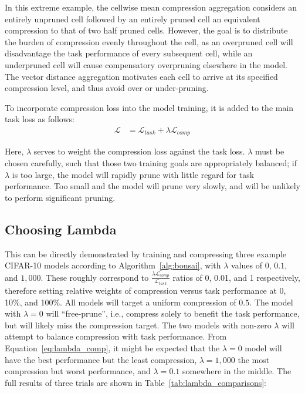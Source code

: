 In this extreme example, the cellwise mean compression aggregation considers an entirely unpruned cell followed by
an entirely pruned cell an equivalent compression to that of two half pruned cells. However, the goal is to distribute the burden
of compression evenly throughout the cell, as an overpruned cell will disadvantage the task performance of every subsequent
cell, while an underpruned cell will cause compensatory overpruning elsewhere in the model. The vector distance aggregation
motivates each cell to arrive at its specified compression level, and thus avoid over or under-pruning.

To incorporate compression loss into the model training, it is added to the main task loss as follows:
\begin{align}
	\mathcal{L} &=  \mathcal{L}_{task} + \lambda \mathcal{L}_{comp} \label{eq:lambda_comp}
\end{align}

\noindent Here, $\lambda$ serves to weight the compression loss against the task loss. $\lambda$ must be chosen carefully,
such that those two training goals are appropriately balanced; if $\lambda$ is too large, the model will rapidly prune
with little regard for task performance. Too small and the model will prune very slowly, and will be unlikely to perform
significant pruning.

\subsection{Choosing Lambda} \label{sect:lambda_choice}
This can be directly demonstrated by training and compressing three example CIFAR-10 models according to
Algorithm~\ref{alg:bonsai}, with $\lambda$ values of 0, $0.1$, and $1,000$. These roughly correspond
to $\frac{\lambda\mathcal{L}_{comp}}{\mathcal{L}_{task}}$ ratios of 0, 0.01, and 1 respectively, therefore setting
relative weights of compression versus task performance at 0, 10\%, and 100\%.
All models will target a uniform compression of $0.5$. The model with $\lambda=0$ will ``free-prune'', i.e.,
compress solely to benefit the task performance, but will likely miss the
compression target. The two models with non-zero $\lambda$ will attempt to balance compression with task performance.
From Equation~\ref{eq:lambda_comp}, it might be expected that the $\lambda=0$ model will have the best performance but the
least compression, $\lambda=1,000$ the most compression but worst performance, and $\lambda=0.1$ somewhere in the middle. The
full results of three trials are shown in Table~\ref{tab:lambda_comparisons}:

